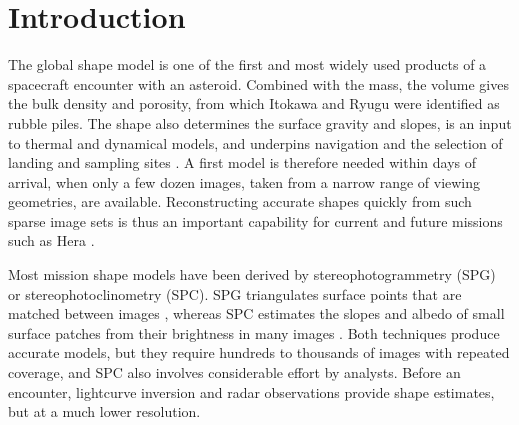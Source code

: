 \documentclass[fleqn,usenatbib]{aa}
\begin{document}

\maketitle

\section{Introduction}
\label{sec:intro}

The global shape model is one of the first and most widely used products of a spacecraft encounter with an asteroid.
Combined with the mass, the volume gives the bulk density and porosity, from which Itokawa \citep{Fujiwara2006} and
Ryugu \citep{Watanabe2019} were identified as rubble piles. The shape also determines the surface gravity and slopes,
is an input to thermal and dynamical models, and underpins navigation and the selection of landing and sampling sites
\citep{Lauretta2019}. A first model is therefore needed within days of arrival, when only a few dozen images, taken
from a narrow range of viewing geometries, are available. Reconstructing accurate shapes quickly from such sparse image
sets is thus an important capability for current and future missions such as Hera \citep{Michel2022}.

Most mission shape models have been derived by stereophotogrammetry (SPG) or stereophotoclinometry (SPC). SPG
triangulates surface points that are matched between images \citep{Preusker2015,Watanabe2019}, whereas SPC estimates
the slopes and albedo of small surface patches from their brightness in many images \citep{Gaskell2008,Palmer2022}.
Both techniques produce accurate models, but they require hundreds to thousands of images with repeated coverage, and
SPC also involves considerable effort by analysts. Before an encounter, lightcurve inversion \citep{Kaasalainen2001}
and radar observations \citep{Ostro2002} provide shape estimates, but at a much lower resolution.
\end{document}
